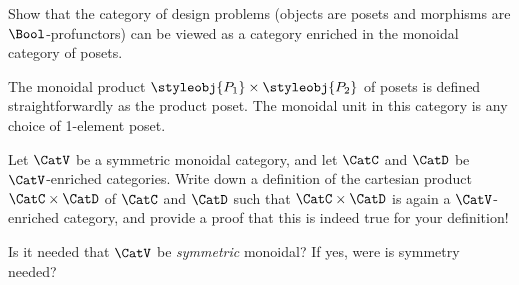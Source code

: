 \begin{gradedexercise}
    \label{ex:DPIsEnrichedInPos}
    Show that the category of design problems (objects are posets and morphisms are $\Bool$-profunctors) can be viewed as a category enriched in the monoidal category of posets.



    The monoidal product $\styleobj{P_1} \times \styleobj{P_2}$ of posets is defined straightforwardly as the product poset.
    The monoidal unit in this category is any choice of 1-element poset.
\end{gradedexercise}


\begin{gradedexercise}
    \label{ex:ProductOfEnrichedCats}
    Let $\CatV$ be a symmetric monoidal category, and let $\CatC$ and $\CatD$ be $\CatV$-enriched categories.
    Write down a definition of the cartesian product $\CatC \times \CatD$ of $\CatC$ and $\CatD$ such that $\CatC \times \CatD$ is again a $\CatV$-enriched category, and provide a proof that this is indeed true for your definition!

    Is it needed that $\CatV$ be \emph{symmetric} monoidal?
    If yes, were is symmetry needed?
\end{gradedexercise}

